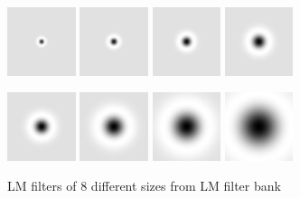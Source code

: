 \begin{figure}[!htb]
\includegraphics[width=2.0cm]{figs/lmf1.png}
\includegraphics[width=2.0cm]{figs/lmf3.png}
\includegraphics[width=2.0cm]{figs/lmf5.png}
\includegraphics[width=2.0cm]{figs/lmf7.png}
\end{figure}
\begin{figure}
\includegraphics[width=2.0cm]{figs/lmf2.png}
\includegraphics[width=2.0cm]{figs/lmf4.png}
\includegraphics[width=2.0cm]{figs/lmf6.png}
\includegraphics[width=2.0cm]{figs/lmf8.png}
\caption{LM filters of 8 different sizes from LM filter bank}
\label{fig:log_filters8}
\end{figure}




